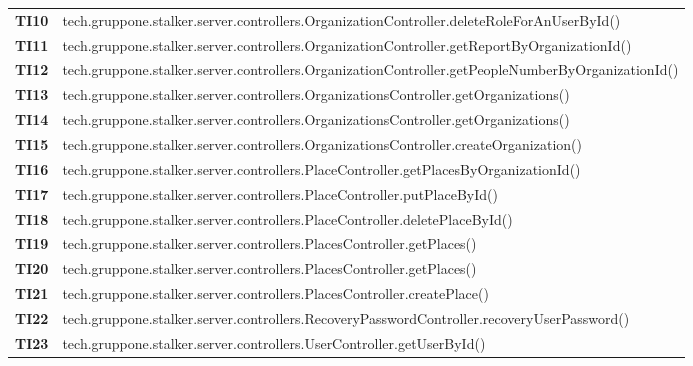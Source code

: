 \documentclass[../../piano-di-qualifica.tex]{subfiles}
\begin{document}
\begin{longtable}[H]{>{\centering\bfseries}m{3cm} >{}m{13cm}}
  TI10               & tech.gruppone.stalker.server.controllers.OrganizationController.deleteRoleForAnUserById\@() \\

  TI11               & tech.gruppone.stalker.server.controllers.OrganizationController.getReportByOrganizationId\@() \\

  TI12               & tech.gruppone.stalker.server.controllers.OrganizationController.getPeopleNumberByOrganizationId\@() \\  

  TI13               & tech.gruppone.stalker.server.controllers.OrganizationsController.getOrganizations\@() \\ 

  TI14               & tech.gruppone.stalker.server.controllers.OrganizationsController.getOrganizations\@() \\ 

  TI15               & tech.gruppone.stalker.server.controllers.OrganizationsController.createOrganization\@() \\ 

  TI16               & tech.gruppone.stalker.server.controllers.PlaceController.getPlacesByOrganizationId\@() \\ 

  TI17               & tech.gruppone.stalker.server.controllers.PlaceController.putPlaceById\@() \\ 

  TI18               & tech.gruppone.stalker.server.controllers.PlaceController.deletePlaceById\@() \\ 

  TI19               & tech.gruppone.stalker.server.controllers.PlacesController.getPlaces\@() \\ 

  TI20               & tech.gruppone.stalker.server.controllers.PlacesController.getPlaces\@() \\ 

  TI21               & tech.gruppone.stalker.server.controllers.PlacesController.createPlace\@() \\ 

  TI22               & tech.gruppone.stalker.server.controllers.RecoveryPasswordController.recoveryUserPassword\@() \\ 

  TI23               & tech.gruppone.stalker.server.controllers.UserController.getUserById\@() \\ 


\end{longtable}
\end{document}

